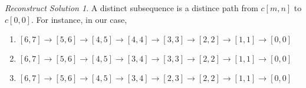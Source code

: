 \documentclass[UTF8]{ctexart}
\theoremstyle{remark}
\begin{document}
\newtheorem*{recon}{Reconstruct Solution}
\begin{recon}
A distinct subsequence is a distince path from $c[m,n]$ to $c[0,0]$. For instance, in our case, 
\begin{enumerate}
	\item $[6,7] \rightarrow [5, 6] \rightarrow [4, 5] \rightarrow [4, 4] \rightarrow [3, 3] \rightarrow [2, 2] \rightarrow [1, 1] \rightarrow [0,0]$ 
	\item $[6,7] \rightarrow [5, 6] \rightarrow [4, 5] \rightarrow [3, 4] \rightarrow [3, 3] \rightarrow [2, 2] \rightarrow [1, 1] \rightarrow [0,0]$
	\item $[6,7] \rightarrow [5, 6] \rightarrow [4, 5] \rightarrow [3, 4] \rightarrow [2, 3] \rightarrow [2, 2] \rightarrow [1, 1] \rightarrow [0,0]$
\end{enumerate}
\end{recon}
\end{document}
